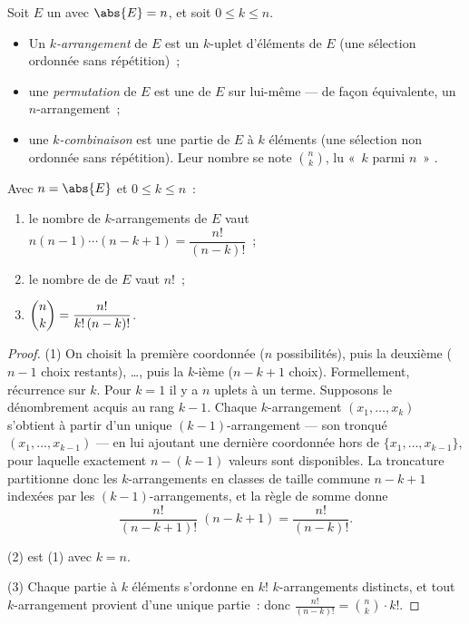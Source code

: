 \begin{definition}\label{def:b1:counting:objects}
Soit $E$ un  avec $\abs{E} = n$, et soit $0 \leq k \leq n$.
\begin{itemize}
  \item Un \emph{$k$-arrangement} de $E$ est un $k$-uplet 
        d'éléments de $E$ (une sélection ordonnée sans répétition)~;
  \item une \emph{permutation} de $E$ est une 
        de $E$ sur lui-même --- de façon équivalente, un $n$-arrangement~;
  \item une \emph{$k$-combinaison} est une partie de $E$ à $k$ éléments
        (une sélection non ordonnée sans répétition). Leur nombre se
        note $\binom{n}{k}$, lu «~$k$ parmi $n$~»
        .
\end{itemize}
\end{definition}

\begin{theorem}\label{thm:b1:counting:counts}
Avec $n = \abs{E}$ et $0 \leq k \leq n$~:
\begin{enumerate}
  \item le nombre de $k$-arrangements de $E$ vaut $n (n-1) \cdots
        (n-k+1) = \dfrac{n!}{(n-k)!}$~;
  \item le nombre de  de $E$ vaut $n!$~;
  \item $\dbinom{n}{k} = \dfrac{n!}{k!\,(n-k)!}$.
\end{enumerate}
\end{theorem}

\begin{proof}
(1) On choisit la première coordonnée ($n$ possibilités), puis la deuxième
($n - 1$ choix restants), \dots, puis la $k$-ième ($n - k + 1$ choix).
Formellement, récurrence sur $k$. Pour $k = 1$ il y a $n$ uplets
 à un terme. Supposons le dénombrement acquis au rang $k - 1$.
Chaque $k$-arrangement $(x_1, \dots, x_k)$ s'obtient à partir d'un unique
$(k-1)$-arrangement --- son tronqué $(x_1, \dots, x_{k-1})$
--- en lui ajoutant une dernière coordonnée hors de $\{x_1, \dots,
x_{k-1}\}$, pour laquelle exactement $n - (k - 1)$ valeurs sont
disponibles. La troncature partitionne donc les $k$-arrangements en
classes de taille commune $n - k + 1$ indexées par les
$(k-1)$-arrangements, et la règle de somme donne
\[
\frac{n!}{(n-k+1)!}\;(n - k + 1) = \frac{n!}{(n-k)!} .
\]

(2) est (1) avec $k = n$.

(3) Chaque partie à $k$ éléments s'ordonne en $k!$ $k$-arrangements
distincts, et tout $k$-arrangement provient d'une unique partie~: donc
$\frac{n!}{(n-k)!} = \binom nk \cdot k!$.
\end{proof}

